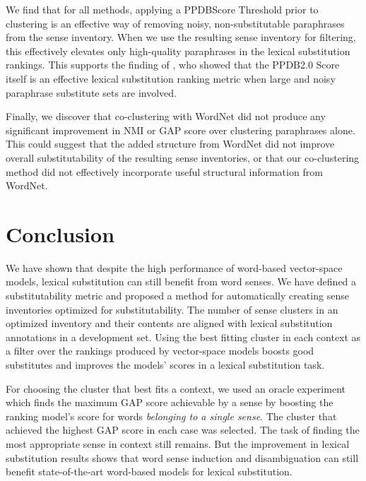 \documentclass[11pt]{article}
\begin{document}
	We find that for all methods, applying a PPDBScore Threshold prior to clustering is an effective way of removing noisy, non-substitutable paraphrases from the sense inventory. When we use the resulting sense inventory for filtering, this effectively elevates only high-quality paraphrases in the lexical substitution rankings. This supports the finding of , who showed that the PPDB2.0 Score itself is an effective lexical substitution ranking metric when large and noisy paraphrase substitute sets are involved.
	
	Finally, we discover that co-clustering with WordNet did not produce any significant improvement in NMI or GAP score over clustering paraphrases alone. This could suggest that the added structure from WordNet did not improve overall substitutability of the resulting sense inventories, or that our co-clustering method did not effectively incorporate useful structural information from WordNet.
	
	
	\section{Conclusion}
	
	We have shown that despite the high performance of word-based vector-space models, lexical substitution can still benefit from word senses. We have defined a substitutability metric and proposed a method for automatically creating sense inventories optimized for substitutability. The number of sense clusters in an optimized inventory and their contents are aligned with lexical substitution annotations in a development set. Using the best fitting cluster in each context as a filter over the rankings produced by vector-space models boosts good substitutes and improves the models' scores in a lexical substitution task. 
	
	For choosing the cluster that best fits a context, we used an oracle experiment which finds the maximum GAP score achievable by a sense by boosting the ranking model's score for words \textit{belonging to a single sense}. The cluster that achieved the highest GAP score in each case was selected. The task of finding the most appropriate sense in context still remains. But the improvement in lexical substitution results shows that word sense induction and disambiguation can still benefit state-of-the-art word-based models for lexical substitution. 
	
\end{document}
